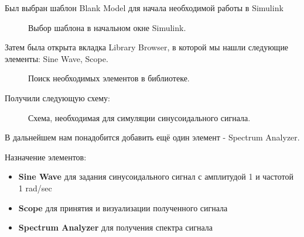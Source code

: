 \documentclass[a4paper,14pt]{extarticle}
\begin{document}
Был выбран шаблон Blank Model для начала необходимой работы в Simulink 

\begin{figure}[H]
\caption{Выбор шаблона в начальном окне Simulink.}
\label{001}
\end{figure}

Затем была открыта вкладка Library Browser, в которой мы нашли следующие элементы: Sine Wave, Scope.

\begin{figure}[H]
\caption{Поиск необходимых элементов в библиотеке.}
\label{002}
\end{figure}

Получили следующую схему:

\begin{figure}[H]
\caption{Схема, необходимая для симуляции синусоидального сигнала.}
\label{008}
\end{figure}

В дальнейшем нам понадобится добавить ещё один элемент - Spectrum Analyzer.

Назначение элементов:
\begin{itemize}
\item \textbf{Sine Wave} для задания синусоидального сигнал с амплитудой 1 и частотой 1 rad/sec
\item \textbf{Scope} для принятия и визуализации полученного сигнала
\item \textbf{Spectrum Analyzer} для получения спектра сигнала\\
\end{itemize}
\end{document}

